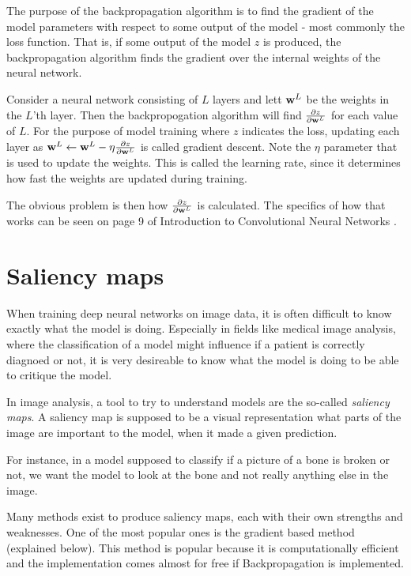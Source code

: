 The purpose of the backpropagation algorithm is to find the gradient of the model parameters with respect
to some output of the model - most commonly the loss function.
That is, if some output of the model $z$ is produced, the backpropagation algorithm finds the gradient over
the internal weights of the neural network.

Consider a neural network consisting of $L$ layers and lett $\textbf{w}^L$ be the weights in the $L$'th layer.
Then the backpropogation algorithm will find 
$\frac{\partial z}{\partial \textbf{w}^L}$ for each value of $L$.
For the purpose of model training where $z$ indicates the loss, updating each layer as 
$\textbf{w}^L \leftarrow \textbf{w}^L - \eta \frac{\partial z}{\partial \textbf{w}^L}$
is called gradient descent.
Note the $\eta$ parameter that is used to update the weights.
This is called the learning rate, since it determines how fast the weights are updated during training.

The obvious problem is then how $\frac{\partial z}{\partial \textbf{w}^L}$ is calculated.
The specifics of how that works can be seen on page 9 of Introduction to Convolutional Neural Networks \cite{tensorIntroduction}.



\section{Saliency maps}
When training deep neural networks on image data,
it is often difficult to know exactly what the model is doing.
Especially in fields like medical image analysis, 
where the classification of a model might influence if a patient is correctly diagnoed or not,
it is very desireable to know what the model is doing to be able to critique the model.

In image analysis, a tool to try to understand models are the so-called \textit{saliency maps}.
A saliency map is supposed to be a visual representation what parts of the image are important to the model,
when it made a given prediction.

For instance, in a model supposed to classify if a picture of a bone is broken or not,
we want the model to look at the bone and not really anything else in the image.

Many methods exist to produce saliency maps, each with their own strengths and weaknesses.
One of the most popular ones is the gradient based method (explained below).
This method is popular because it is computationally efficient and the implementation comes almost for free if Backpropagation is implemented.

